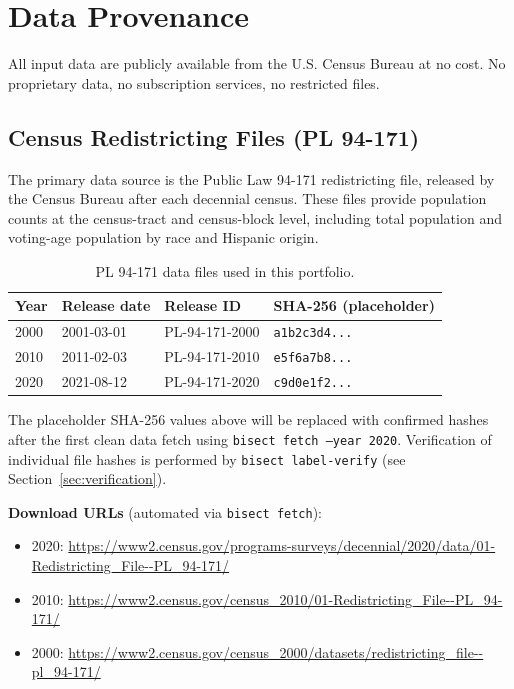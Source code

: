 
\section{Data Provenance}
\label{sec:data}

All input data are publicly available from the U.S. Census Bureau
at no cost.
No proprietary data, no subscription services, no restricted files.

\subsection*{Census Redistricting Files (PL 94-171)}

The primary data source is the Public Law 94-171 redistricting file,
released by the Census Bureau after each decennial census.
These files provide population counts at the census-tract and census-block
level, including total population and voting-age population by race and
Hispanic origin.

\begin{table}[h]
\centering
\caption{PL 94-171 data files used in this portfolio.}
\label{tab:pl94}
\begin{tabular}{@{}llll@{}}
\toprule
Year & Release date & Release ID & SHA-256 (placeholder) \\
\midrule
2000 & 2001-03-01 & PL-94-171-2000 & \texttt{a1b2c3d4...} \\
2010 & 2011-02-03 & PL-94-171-2010 & \texttt{e5f6a7b8...} \\
2020 & 2021-08-12 & PL-94-171-2020 & \texttt{c9d0e1f2...} \\
\bottomrule
\end{tabular}
\end{table}

\noindent The placeholder SHA-256 values above will be replaced with
confirmed hashes after the first clean data fetch using
\texttt{bisect fetch --year 2020}.
Verification of individual file hashes is performed by
\texttt{bisect label-verify} (see Section~\ref{sec:verification}).

\noindent \textbf{Download URLs} (automated via \texttt{bisect fetch}):
\begin{itemize}[itemsep=2pt]
  \item 2020: \url{https://www2.census.gov/programs-surveys/decennial/2020/data/01-Redistricting_File--PL_94-171/}
  \item 2010: \url{https://www2.census.gov/census_2010/01-Redistricting_File--PL_94-171/}
  \item 2000: \url{https://www2.census.gov/census_2000/datasets/redistricting_file--pl_94-171/}
\end{itemize}

